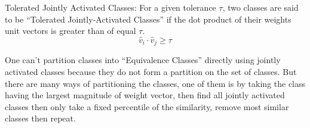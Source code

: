 \begin{definition}{Tolerated Jointly Activated Classes:}
For a given tolerance \(\tau\), two classes are said to be ``Tolerated Jointly-Activated Classes''
if the dot product of their weights unit vectors is greater than of equal \(\tau\).
\begin{equation}
\hat{v}_{i}\cdot \hat{v}_{j} \geq \tau
\label{eq:tol_jointly_activated}
\end{equation}
\label{def:tol_jointly_activated}
\end{definition}


One can't partition classes into ``Equivalence Classes'' directly using jointly activated classes
because they do not form a partition on the set of classes. But there are many ways of partitioning the classes,
one of them is by taking the class having the largest magnitude of weight vector, then find all jointly activated classes
then only take a fixed percentile of the similarity, remove most similar classes then repeat. 

